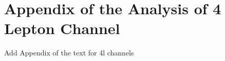 \section{Appendix of the Analysis of 4 Lepton Channel }
\label{sec:AppAnaFourL}

Add Appendix of the text for 4l channels 
